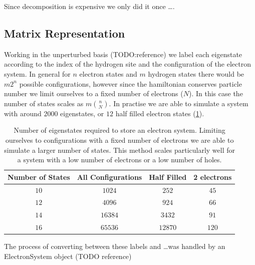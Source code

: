Since decomposition is
expensive we only did it
once \ldots.


\subsection{Matrix Representation}\label{sec:state representation}
Working in the unperturbed basis (TODO:reference)
we label each eigenstate
according to the index of the
hydrogen site and
the configuration of the
electron system.
In general for \(n\)
electron states
and \(m\) hydrogen states
there would
be \(m 2^n\)
possible configurations,
however since the hamiltonian
conserves particle number
we limit ourselves
to a fixed
number of electrons (\(N\)).
In this case the number
of states scales as \(m \binom{n}{N}\).
In practise we are able to
simulate a system with
around \(2000\) eigenstates,
or \(12\) half filled electron states
(\cref{tab:number of eigenstates}).
\begin{table}[htb]
    \begin{center}
        \begin{tabular}{ *{4}{c} }
            \toprule
            Number of States & All Configurations & Half Filled & 2 electrons \\
            \midrule
            \(10\)           & \(1024\)           & \(252\)     & \(45\)      \\
            \(12\)           & \(4096\)           & \(924\)     & \(66\)      \\
            \(14\)           & \(16384\)          & \(3432\)    & \(91\)      \\
            \(16\)           & \(65536\)          & \(12870\)   & \(120\)     \\
            \bottomrule
        \end{tabular}
    \end{center}
    \caption{
        Number of eigenstates required
        to store an electron system.
        Limiting ourselves to
        configurations with a fixed
        number of electrons we are
        able to simulate a larger
        number of states.
        This method scales particularly
        well for a system with a
        low number of electrons
        or a low number of holes.
    }\label{tab:number of eigenstates}
\end{table}

The process of converting
between these labels and
\ldots was handled by
an ElectronSystem object (TODO reference)


